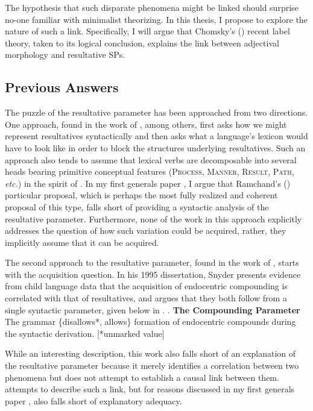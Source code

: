 \documentclass[letterpaper,12pt]{article}
\begin{document}
The hypothesis that such disparate phenomena might be linked should surprise no-one familiar with minimalist theorizing.
In this thesis, I propose to explore the nature of such a link.
Specifically, I will argue that Chomsky's (\citeyear{chomsky2013problems,chomsky2015problems}) recent label theory, taken to its logical conclusion, explains the link between adjectival morphology and resultative SPs.


\subsection{Previous Answers}
The puzzle of the resultative parameter has been approached from two directions.
One approach, found in the work of \textcite{harley2005how,folli2006licensing,ramchand2008verb,tungseth2008verbal}, among others, first asks how we might represent resultatives syntactically and then asks what a language's lexicon would have to look like in order to block the structures underlying resultatives.
Such an approach also tends to assume that lexical verbs are decomposable into several heads bearing primitive conceptual features (\textsc{Process}, \textsc{Manner}, \textsc{Result}, \textsc{Path}, \textit{etc.}) in the spirit of \textcite{hale1993argument}.
In my first generals paper \parencite[][pp 30-32]{milway2015generals}, I argue that Ramchand's (\citeyear{ramchand2008verb}) particular proposal, which is perhaps the most fully realized and coherent proposal of this type, falls short of providing a syntactic analysis of the resultative parameter.
Furthermore, none of the work in this approach explicitly addresses the question of how such variation could be acquired, rather, they implicitly assume that it can be acquired.

The second approach to the resultative parameter, found in the work of \textcite{snyder1995language,snyder2001nature,roeper2002learnability,beck2001complex}, starts with the acquisition question.
In his 1995 dissertation, Snyder presents evidence from child language data that the acquisition of endocentric compounding is correlated with that of resultatives, and argues that they both follow from a single syntactic parameter, given below in \Next.
\ex. \textbf{The Compounding Parameter} \parencite{snyder2001nature}\\ 
The grammar \{disallows*, allows\} formation of endocentric compounds during the syntactic derivation. [*unmarked value] 

While an interesting description, this work also falls short of an explanation of the resultative parameter because it merely identifies a correlation between two phenomena but does not attempt to establish a causal link between them.
\textcite{kratzer_building_2004} attempts to describe such a link, but for reasons discussed in my first generals paper \parencite[][pp 32-34]{milway2015generals}, also falls short of explanatory adequacy.
\end{document}
